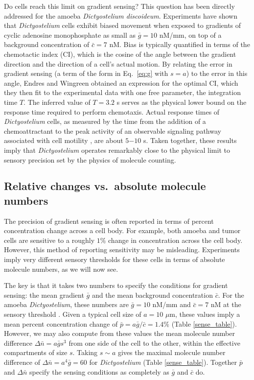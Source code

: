 Do cells reach this limit on gradient sensing? This question has been directly addressed for the amoeba \textit{Dictyostelium discoideum}. Experiments \cite{van2007biased} have shown that \textit{Dictyostelium} cells exhibit biased movement when exposed to gradients of cyclic adenosine monophosphate as small as $\bar{g} = 10$ nM/mm, on top of a background concentration of $\bar{c} = 7$ nM. Bias is typically quantified in terms of the chemotactic index (CI), which is the cosine of the angle between the gradient direction and the direction of a cell's actual motion. By relating the error in gradient sensing (a term of the form in Eq.\ \ref{eq:g} with $s = a$) to the error in this angle, Endres and Wingreen \cite{endres2008accuracy} obtained an expression for the optimal CI, which they then fit to the experimental data with one free parameter, the integration time $T$. The inferred value of $T = 3.2$ s serves as the physical lower bound on the response time required to perform chemotaxis. Actual response times of \textit{Dictyostelium} cells, as measured by the time from the addition of a chemoattractant to the peak activity of an observable signaling pathway associated with cell motility \cite{postma2003uniform, parent2004making}, are about $5$$-$$10$ s. Taken together, these results imply that \textit{Dictyostelium} operates remarkably close to the physical limit to sensory precision set by the physics of molecule counting.

\subsection{Relative changes vs.\ absolute molecule numbers}

The precision of gradient sensing is often reported in terms of percent concentration change across a cell body. For example, both amoeba \cite{van2007biased} and tumor cells \cite{shields2007autologous} are sensitive to a roughly $1\%$ change in concentration across the cell body. However, this method of reporting sensitivity may be misleading. Experiments imply very different sensory thresholds for these cells in terms of absolute molecule numbers, as we will now see.

The key is that it takes two numbers to specify the conditions for gradient sensing: the mean gradient $\bar{g}$ and the mean background concentration $\bar{c}$. For the amoeba \textit{Dictyostelium}, these numbers are $\bar{g} = 10$ nM/mm and $\bar{c} = 7$ nM at the sensory threshold \cite{van2007biased}. Given a typical cell size of $a = 10$ $\mu$m, these values imply a mean percent concentration change of $\bar{p} = a\bar{g}/\bar{c} = 1.4\%$ (Table \ref{sense_table}). However, we may also compute from these values the mean molecule number difference
$\Delta\bar{n} = a\bar{g}s^3$
from one side of the cell to the other, within the effective compartments of size $s$. Taking $s\sim a$ gives the maximal molecule number difference of $\Delta\bar{n} = a^4\bar{g} = 60$
for \textit{Dictyostelium} (Table \ref{sense_table}). Together $\bar{p}$ and $\Delta\bar{n}$ specify the sensing conditions as completely as $\bar{g}$ and $\bar{c}$ do.

